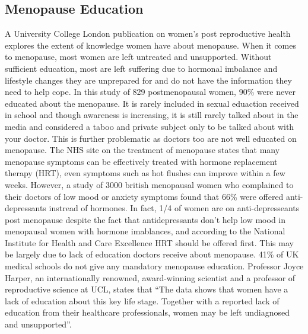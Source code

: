 \subsection{Menopause Education}
A University College London publication on women's post reproductive health\cite{Aljumah2023} explores the extent of knowledge women have about menopause. When it comes to menopause, most women are left untreated and unsupported. Without sufficient education, most are left suffering due to hormonal imbalance and lifestyle changes they are unprepared for and do not have the information they need to help cope. In this study of 829 postmenopausal women, 90\% were never educated about the menopause. It is rarely included in sexual eduaction received in school and though awareness is increasing, it is still rarely talked about in the media and considered a taboo and private subject only to be talked about with your doctor\cite{Muir2022}. This is further problematic as doctors too are not well educated on menopause\cite{MenopauseSupport2021}. The NHS site on the treatment of menopause\cite{NHS2022} states that many menopause symptoms can be effectively treated with hormone replacement therapy (HRT), even symptoms such as hot flushes can improve within a few weeks. However, a study of 3000 british menopausal women who complained to their doctors of low mood or anxiety symptoms found that 66\% were offered anti-depressants instread of hormones\cite{NewsonHealth2019}. In fact, 1/4 of women are on anti-depresseants post menopause\cite{Brody2020} despite the fact that antidepressants don't help low mood in menopausal women with hormone imablances, and according to the National Institute for Health and Care Excellence\cite{NICE2019} HRT should be offered first. This may be largely due to lack of education doctors receive about menopause. 41\% of UK medical schools do not give any mandatory menopause education\cite{MenopauseSupport2021}. Professor Joyce Harper, an internationally renowned, award-winning scientist and a professor of reproductive science at UCL, states that “The data shows that women have a lack of education about this key life stage. Together with a reported lack of education from their healthcare professionals, women may be left undiagnosed and unsupported”\cite{UCL2023}.

